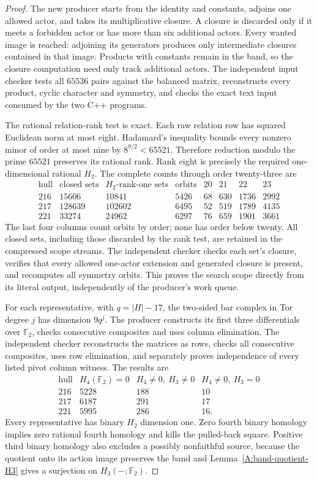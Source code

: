 \begin{proof}
The new producer
 starts from
the identity and constants, adjoins one allowed actor,
and takes its multiplicative closure. A closure is
discarded only if it meets a forbidden actor or has
more than six additional actors. Every wanted image
is reached: adjoining its generators produces only
intermediate closures contained in that image.
Products with constants remain in the band, so the
closure computation need only track additional actors.
The independent input checker tests all $65536$ pairs
against the balanced matrix, reconstructs every product,
cyclic character and symmetry, and checks the exact
text input consumed by the two C++ programs.

The rational relation-rank test is exact. Each raw
relation row has squared Euclidean norm at most eight.
Hadamard's inequality bounds every nonzero minor of
order at most nine by $8^{9/2}<65521$. Therefore
reduction modulo the prime $65521$ preserves its
rational rank. Rank eight is precisely the required
one-dimensional rational $H_2$.
The complete counts through order twenty-three are
\[
\begin{array}{c|r|r|r|rrrr}
\text{hull}&\text{closed sets}&H_2\text{-rank-one sets}
 &\text{orbits}&20&21&22&23\\\hline
216&15606&10841&5426&68&630&1736&2992\\
217&128639&102602&6495&52&519&1789&4135\\
221&33274&24962&6297&76&659&1901&3661
\end{array}
\]
The last four columns count orbits by order; none has
order below twenty. All closed sets, including those
discarded by the rank test, are retained in the
compressed scope streams. The independent checker
 checks each set's
closure, verifies that every allowed one-actor extension
and generated closure is present, and recomputes all
symmetry orbits. This proves the search scope directly
from its literal output, independently of the producer's
work queue.

For each representative, with $q=|H|-17$, the two-sided
bar complex in Tor degree $j$ has dimension $9q^j$.
The producer constructs its first three differentials
over $\mathbb F_2$, checks consecutive composites and
uses column elimination. The independent checker
reconstructs the matrices as rows, checks all
consecutive composites, uses row elimination, and
separately proves independence of every listed pivot
column witness. The results are
\[
\begin{array}{c|r|r|r}
\text{hull}&H_4(\mathbb F_2)=0
 &H_4\ne0,\ H_3\ne0&H_4\ne0,\ H_3=0\\\hline
216&5228&188&10\\
217&6187&291&17\\
221&5995&286&16.
\end{array}
\]
Every representative has binary $H_2$ dimension one.
Zero fourth binary homology implies zero rational
fourth homology and kills the pulled-back square.
Positive third binary homology also excludes a
possibly nonfaithful source, because the quotient
onto its action image preserves the band and
Lemma~\ref{A:band-quotient-H3} gives a surjection
on $H_3(-;\mathbb F_2)$.


\end{proof}
